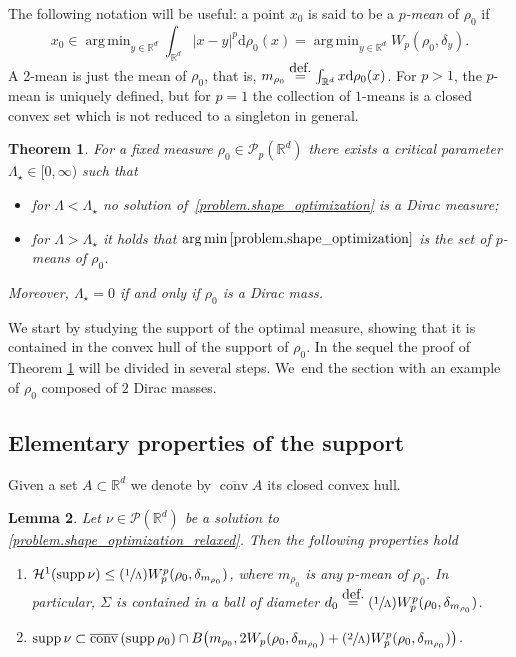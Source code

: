 \documentclass[11pt]{article}
\numberwithin{equation}{section}
\newcommand{\Psfrac}[2]{(\sfrac{#1}{#2})}
\newtheorem{theorem}{Theorem}[section]
\newtheorem{lemma}[theorem]{Lemma}
\theoremstyle{definition}
\newcommand{\eqdef}{\ensuremath{\stackrel{\mbox{\upshape\tiny def.}}{=}}}
\newcommand\cH{\mathcal{H}}
\newcommand{\RR}{\mathbb{R}}
\DeclareMathOperator*{\argmin}{arg\,min}
\DeclareMathOperator{\supp}{supp}
\DeclareMathOperator{\conv}{conv}
\newcommand{\cconv}{\overline{\conv}}
\newcommand\dd{\mathrm{d}}
\begin{document}
The following notation will be useful: a point $x_0$ is said to be a \emph{$p$-mean} of $\rho_0$ if
\[
x_0 \in
\argmin_{y \in \RR^d} \int_{\RR^d}|x - y|^p\dd \rho_0(x)
=
\argmin_{y \in \RR^d} W_p(\rho_0, \delta_y).
\]
A 2-mean is just the mean of $\rho_0$, that is, $m_{\rho_0} \eqdef \int_{\RR^d}x \dd \rho_0(x)$. For $p>1$, the $p$-mean is uniquely defined, but for $p=1$ the collection of $1$-means is a closed convex set which is not reduced to a singleton in general.

\begin{theorem}\label{theorem.when_sols_are_diracs}
For a fixed measure $\rho_0 \in \mathcal{P}_p(\RR^d)$ there exists a critical parameter $\Lambda_\star \in [0, \infty)$ such that
\begin{itemize}
\item for $\Lambda < \Lambda_\star$ no solution of~\eqref{problem.shape_optimization}
is a Dirac measure;
\item for $\Lambda > \Lambda_\star$ it holds that
$\argmin\eqref{problem.shape_optimization}$
is the set of $p$-means of $\rho_0$.
\end{itemize}
Moreover, $\Lambda_\star=0$ if and only if $\rho_0$ is a Dirac mass.
\end{theorem}

We start by studying the support of the optimal measure, showing that it is contained in the convex hull of the support of $\rho_0$. In the sequel the proof of Theorem \ref{theorem.when_sols_are_diracs} will be divided in several steps. We~end the section with an example of $\rho_0$ composed of $2$ Dirac masses.

\subsection{Elementary properties of the support}
Given a set $A \subset \RR^d$ we denote by $\cconv A$ its closed convex hull.
\begin{lemma}\label{lem.convexhull}
Let $\nu \in\mathcal{P}(\RR^d)$ be a solution to \eqref{problem.shape_optimization_relaxed}. Then the following properties hold
\begin{enumerate}
\item
$\cH^1(\supp \nu)\leq \Psfrac{1}{\Lambda}W^p_p(\rho_0,\delta_{m_{\rho_0}})$, where $m_{\rho_0}$ is any $p$-mean of $\rho_0$. In particular, $\Sigma$ is contained in a ball of diameter $d_0\eqdef \Psfrac{1}{\Lambda}W^p_p(\rho_0,\delta_{m_{\rho_0}})$.
\item
$\supp \nu \subset \cconv\left(\supp \rho_0\right)
\cap B\big({m_{\rho_0}},2W_p(\rho_0,\delta_{m_{\rho_0}})
+ \Psfrac{2}{\Lambda}W_p^p(\rho_0,\delta_{m_{\rho_0}})\big)$.
\end{enumerate}
\end{lemma}
\end{document}
